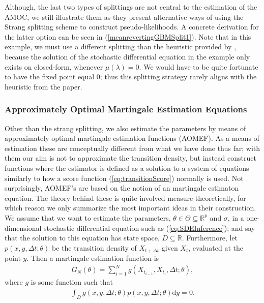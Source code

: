 Although, the last two types of splittings are not central to the estimation of the AMOC, we still illustrate them as they present alternative ways of using the Strang splitting scheme to construct pseudo-likelihoods. A concrete derivation for the latter option can be seen in (\ref{meanrevertingGBMSplit1}). Note that in this example, we must use a different splitting than the heuristic provided by \cite[section 2.3 and 2.5]{SplittingSchemes}, because the solution of the stochastic differential equation in the example only exists on closed-form, whenever $\mu(\lambda) = 0$. We would have to be quite fortunate to have the fixed point equal 0; thus this splitting strategy rarely aligns with the heuristic from the paper.
\subsubsection{Approximately Optimal Martingale Estimation Equations}\label{subsubsec:approximatelyOptimalMartingaleEstimationEquation}
Other than the strang splitting, we also estimate the parameters by means of approximately optimal martingale estimation functions (AOMEF). As a means of estimation these are conceptually different from what we have done thus far; with them our aim is not to approximate the transition density, but instead construct functions where the estimator is defined as a solution to a system of equations similarly to how a score function (\ref{eq:transitionScore}) normally is used. Not surprisingly, AOMEF's are based on the notion of an martingale estimaton equation. The theory behind these is quite involved measure-theoretically, for which reason we only summarize the most important ideas in their construction. We assume that we want to estimate the parameters, $\theta\in \Theta \subseteq \mathbb{R}^p$ and $\sigma$, in a one-dimensional stochastic differential equation such as (\ref{eq:SDEInference}); and say that the solution to this equation has state space, $D\subseteq \mathbb{R}$. Furthermore, let $p(x, y, \Delta t; \theta)$ be the transition density of $X_{t+\Delta t}$ given $X_t$, evaluated at the point $y$. Then a martingale estimation function is 
\begin{align}
    G_N(\theta) = \sum_{i = 1}^N g(X_{t_{i - 1}}, X_{t_i}, \Delta t; \theta), \label{eq:estimationEquation}
\end{align}
where $g$ is some function such that
\begin{align}
    \int_{D} g(x, y, \Delta t; \theta)p(x, y, \Delta t; \theta)\mathrm{d}y = 0. \label{eq:martingaleProperty}
\end{align}
